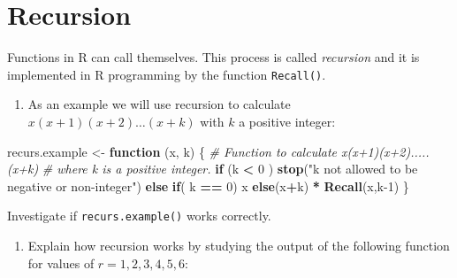 \documentclass[
]{book}
\newenvironment{Shaded}{\begin{snugshade}}{\end{snugshade}}
\newcommand{\CommentTok}[1]{\textcolor[rgb]{0.56,0.35,0.01}{\textit{#1}}}
\newcommand{\ControlFlowTok}[1]{\textcolor[rgb]{0.13,0.29,0.53}{\textbf{#1}}}
\newcommand{\DecValTok}[1]{\textcolor[rgb]{0.00,0.00,0.81}{#1}}
\newcommand{\FunctionTok}[1]{\textcolor[rgb]{0.13,0.29,0.53}{\textbf{#1}}}
\newcommand{\NormalTok}[1]{#1}
\newcommand{\OtherTok}[1]{\textcolor[rgb]{0.56,0.35,0.01}{#1}}
\newcommand{\SpecialCharTok}[1]{\textcolor[rgb]{0.81,0.36,0.00}{\textbf{#1}}}
\newcommand{\StringTok}[1]{\textcolor[rgb]{0.31,0.60,0.02}{#1}}
\providecommand{\tightlist}{%
  \setlength{\itemsep}{0pt}\setlength{\parskip}{0pt}}
\begin{document}
\section{Recursion}\label{recursion}

Functions in R can call themselves. This process is called \emph{{recursion}} and it is implemented in R programming by the function \texttt{Recall()}.

\begin{enumerate}
\def\labelenumi{(\alph{enumi})}
\tightlist
\item
  As an example we will use recursion to calculate \(x(x+1)(x+2)\dots(x+k)\) with \(k\) a positive integer:
\end{enumerate}

\begin{Shaded}
\begin{Highlighting}[]
\NormalTok{recurs.example }\OtherTok{\textless{}{-}} \ControlFlowTok{function}\NormalTok{ (x, k) }
\NormalTok{\{ }\CommentTok{\# Function to calculate x(x+1)(x+2).....(x+k)}
  \CommentTok{\# where k is a positive integer.}
     \ControlFlowTok{if}\NormalTok{ (k }\SpecialCharTok{\textless{}} \DecValTok{0}\NormalTok{ ) }
      \FunctionTok{stop}\NormalTok{(}\StringTok{"k not allowed to be negative or non{-}integer"}\NormalTok{)}
    \ControlFlowTok{else} \ControlFlowTok{if}\NormalTok{( k }\SpecialCharTok{==} \DecValTok{0}\NormalTok{) x}
       \ControlFlowTok{else}\NormalTok{(x}\SpecialCharTok{+}\NormalTok{k) }\SpecialCharTok{*} \FunctionTok{Recall}\NormalTok{(x,k}\DecValTok{{-}1}\NormalTok{)}
\NormalTok{   \}}
\end{Highlighting}
\end{Shaded}

Investigate if \texttt{recurs.example()} works correctly.

\begin{enumerate}
\def\labelenumi{(\alph{enumi})}
\setcounter{enumi}{1}
\tightlist
\item
  Explain how recursion works by studying the output of the following function for values of \(r = 1, 2, 3, 4, 5, 6\):
\end{enumerate}
\end{document}
